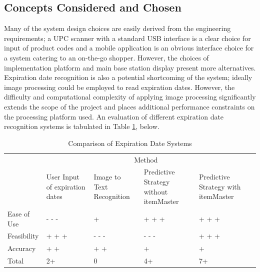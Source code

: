 \documentclass[11pt,letterpaper]{article}
\begin{document}
\subsection{Concepts Considered and Chosen}
Many of the system design choices are easily derived from the engineering requirements; a UPC scanner with a standard USB interface is a clear choice for input of product codes and a mobile application is an obvious interface choice for a system catering to an on-the-go shopper. However, the choices of implementation platform and main base station display present more alternatives. Expiration date recognition is also a potential shortcoming of the system; ideally image processing could be employed to read expiration dates. However, the difficulty and computational complexity of applying image processing significantly extends the scope of the project and places additional performance constraints on the processing platform used. An evaluation of different expiration date recognition systems is tabulated in Table \ref{tab:datesys}, below.
\begin{table}[h!]
\caption{Comparison of Expiration Date Systems}
\begin{tabular}{| p{1in} | p{1.15in} | p{1.15in} | p{1.15in} | p{1.15in}  | p{1.15in} |}
\cline{2-5}
\multicolumn{1}{c}{}&\multicolumn{4}{|c|}{Method} \\
\cline{2-5}
\multicolumn{1}{c|}{}&User Input \newline of expiration \newline dates& Image to Text \newline Recognition & Predictive \newline Strategy without \newline itemMaster& Predictive \newline Strategy with \newline itemMaster \\
\hline
Ease of Use&- - -&+&+ + +&+ + +\\
\hline
Feasibility&+ + +&- - -&- - -&+ + +\\
\hline
Accuracy & + + & + + &+&+\\
\hline \hline
Total &2+ &0&4+&7+\\
\hline
\end{tabular}
\label{tab:datesys}
\end{table}
\newline \quad \newline
\end{document}
